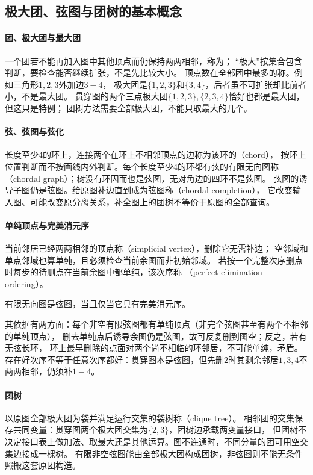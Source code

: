 \subsection{极大团、弦图与团树的基本概念}

\paragraph{团、极大团与最大团}
一个团若不能再加入图中其他顶点而仍保持两两相邻，称为；
“极大”按集合包含判断，要检查能否继续扩张，不是先比较大小。
顶点数在全部团中最多的称。例如三角形$1,2,3$外加边$3-4$，
极大团是$\{1,2,3\}$和$\{3,4\}$，后者虽不可扩张却比前者小，不是最大团。
贯穿图的两个三点极大团$\{1,2,3\},\{2,3,4\}$恰好也都是最大团，但这只是特例；
团树方法需要全部极大团，不能只取最大的几个。

\paragraph{弦、弦图与弦化}
长度至少$4$的环上，连接两个在环上不相邻顶点的边称为该环的（chord），
按环上位置判断而不按画线内外判断。每个长度至少$4$的环都有弦的有限无向图称
（chordal graph）；树没有环因而也是弦图，无对角边的四环不是弦图。
弦图的诱导子图仍是弦图。给原图补边直到成为弦图称（chordal completion），
它改变输入图、可能改变原分离关系，补全图上的团树不等价于原图的全部查询。

\paragraph{单纯顶点与完美消元序}
当前邻居已经两两相邻的顶点称（simplicial vertex），删除它无需补边；
空邻域和单点邻域也算单纯，且必须检查当前余图而非初始邻域。
若按一个完整次序删点时每步的待删点在当前余图中都单纯，该次序称
（perfect elimination ordering）。
\begin{definition}[弦图与完美消元序]
  \label{def:graph-theory-chordal-graph}
  有限无向图是弦图，当且仅当它具有完美消元序。
\end{definition}
其依据有两方面：每个非空有限弦图都有单纯顶点（非完全弦图甚至有两个不相邻的单纯顶点），
删去单纯点后诱导余图仍是弦图，故可反复删到图空；反之，若有无弦长环，
环上最早删除的点面对两个尚不相临的环邻居，不可能单纯，矛盾。
存在好次序不等于任意次序都好：贯穿图本是弦图，但先删$2$时其剩余邻居$1,3,4$不两两相邻，仍须补$1-4$。

\paragraph{团树}
以原图全部极大团为袋并满足运行交集的袋树称（clique tree）。
相邻团的交集保存共同变量：贯穿图两个极大团交集为$\{2,3\}$，团树边承载两变量接口，
但团树不决定接口表上做加法、取最大还是其他运算。图不连通时，不同分量的团可用空交集边接成一棵树。
有限非空弦图能由全部极大团构成团树，非弦图则不能无条件照搬这套原团构造。

